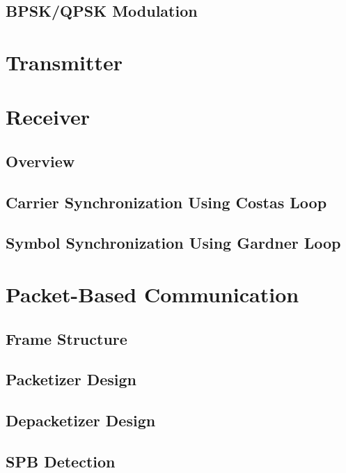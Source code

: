 \documentclass[journal,twoside]{IEEEtran}
\begin{document}
    \subsection{BPSK/QPSK Modulation}

  \section{Transmitter}

  \section{Receiver}

    \subsection{Overview}

    \subsection{Carrier Synchronization Using Costas Loop}

    \subsection{Symbol Synchronization Using Gardner Loop}

  \section{Packet-Based Communication}

    \subsection{Frame Structure}

    \subsection{Packetizer Design}

    \subsection{Depacketizer Design}

    \subsection{SPB Detection}
\end{document}
